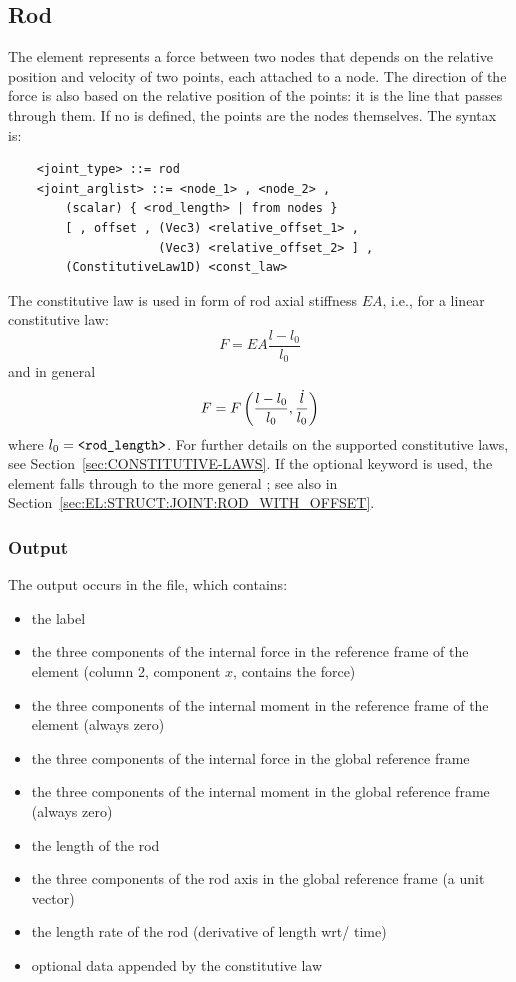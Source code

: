 \subsection{Rod}\label{sec:EL:STRUCT:JOINT:ROD}
The  element represents a force between two nodes that depends
on the relative position and velocity of two points, each attached
to a node.
The direction of the force is also based on the relative position
of the points: it is the line that passes through them.
If no  is defined, the points are the nodes themselves.
The syntax is:
\begin{verbatim}
    <joint_type> ::= rod 
    <joint_arglist> ::= <node_1> , <node_2> , 
        (scalar) { <rod_length> | from nodes }
        [ , offset , (Vec3) <relative_offset_1> , 
                     (Vec3) <relative_offset_2> ] ,
        (ConstitutiveLaw1D) <const_law>
\end{verbatim}
The constitutive law  is used in form 
of rod axial stiffness $EA$, i.e., for a linear constitutive law:
\begin{displaymath}
	F = EA \frac{l - l_0}{l_0}
\end{displaymath}
and in general
\begin{displaymath}
	F = F\left( \frac{l - l_0}{l_0}, \frac{\dot{l}}{l_0} \right)
\end{displaymath}
where $l_0=\texttt{<rod\_length>}$.
For further details on the supported constitutive laws, 
see Section~\ref{sec:CONSTITUTIVE-LAWS}.
If the optional  keyword is used, the element falls through
to the more general ;
see also 
in Section~\ref{sec:EL:STRUCT:JOINT:ROD_WITH_OFFSET}.

\subsubsection{Output}
The output occurs in the  file, which contains:
\begin{itemize}
\item the label
\item the three components of the internal force in the reference frame
of the element (column 2, component $x$, contains the force)
\item the three components of the internal moment in the reference frame
of the element (always zero)
\item the three components of the internal force in the global
reference frame
\item the three components of the internal moment in the global
reference frame (always zero)
\item the length of the rod
\item the three components of the rod axis in the global reference frame
(a unit vector)
\item the length rate of the rod (derivative of length wrt/ time)
\item optional data appended by the constitutive law
\end{itemize}

